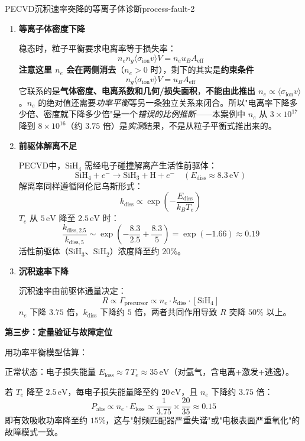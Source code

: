 \documentclass[12pt,a4paper,openany,oneside]{book}
\begin{document}
\begin{example}{PECVD沉积速率突降的等离子体诊断}{process-fault-2}
\begin{enumerate}
    \item \textbf{等离子体密度下降}

    稳态时，粒子平衡要求电离率等于损失率：
    \[
    n_e n_g \langle \sigma_{\text{ion}} v \rangle V = n_e u_B A_{\text{eff}}
    \]
    \textbf{注意这里 $n_e$ 会在两侧消去}（$n_e>0$ 时），剩下的其实是\textbf{约束条件}
    \[
    n_g \langle \sigma_{\text{ion}} v \rangle V = u_B A_{\text{eff}}
    \]
    它联系的是\textbf{气体密度、电离系数和几何/损失面积}，\textbf{不能由此推出 $n_e\propto\langle\sigma_{\text{ion}}v\rangle$}。$n_e$ 的绝对值还需要\emph{功率平衡}等另一条独立关系来闭合。所以"电离率下降多少倍、密度就下降多少倍"是一个\emph{错误的比例推断}——本案例中 $n_e$ 从 $3\times10^{17}$ 降到 $8\times10^{16}$（约 $3.75$ 倍）是\emph{实测}结果，不是从粒子平衡式推出来的。

    \item \textbf{前驱体解离不足}

    PECVD中，$\mathrm{SiH}_4$ 需经电子碰撞解离产生活性前驱体：
    \[
    \mathrm{SiH}_4 + e^- \rightarrow \mathrm{SiH}_3 + \mathrm{H} + e^- \quad (E_{\text{diss}} \approx 8.3\,\mathrm{eV})
    \]
    解离率同样遵循阿伦尼乌斯形式：
    \[
    k_{\text{diss}} \propto \exp\left(-\frac{E_{\text{diss}}}{k_B T_e}\right)
    \]
    $T_e$ 从 $5\,\mathrm{eV}$ 降至 $2.5\,\mathrm{eV}$ 时：
    \[
    \frac{k_{\text{diss},2.5}}{k_{\text{diss},5}} \sim \exp\left(-\frac{8.3}{2.5} + \frac{8.3}{5}\right) = \exp(-1.66) \approx 0.19
    \]
    活性前驱体（$\mathrm{SiH}_3$、$\mathrm{SiH}_2$）浓度降至约 $20\%$。

    \item \textbf{沉积速率下降}
    
    沉积速率由前驱体通量决定：
    \[
    R \propto \Gamma_{\text{precursor}} \propto n_e \cdot k_{\text{diss}} \cdot [\mathrm{SiH}_4]
    \]
    $n_e$ 下降 $3.75$ 倍，$k_{\text{diss}}$ 下降约 $5$ 倍，两者共同作用导致 $R$ 突降 $50\%$ 以上。
\end{enumerate}

\textbf{第三步：定量验证与故障定位}

用功率平衡模型估算：

正常状态：电子损失能量 $E_{\text{loss}} \approx 7\,T_e \approx 35\,\mathrm{eV}$（对氩气，含电离+激发+逃逸）。

若 $T_e$ 降至 $2.5\,\mathrm{eV}$，每电子损失能量降至约 $20\,\mathrm{eV}$，且 $n_e$ 下降约 $3.75$ 倍：
\[
P_{\text{abs}} \propto n_e \cdot E_{\text{loss}} \propto \frac{1}{3.75} \times \frac{20}{35} \approx 0.15
\]
即有效吸收功率降至约 $15\%$，这与"射频匹配器严重失谐"或"电极表面严重氧化"的故障模式一致。


\end{example}
\end{document}
